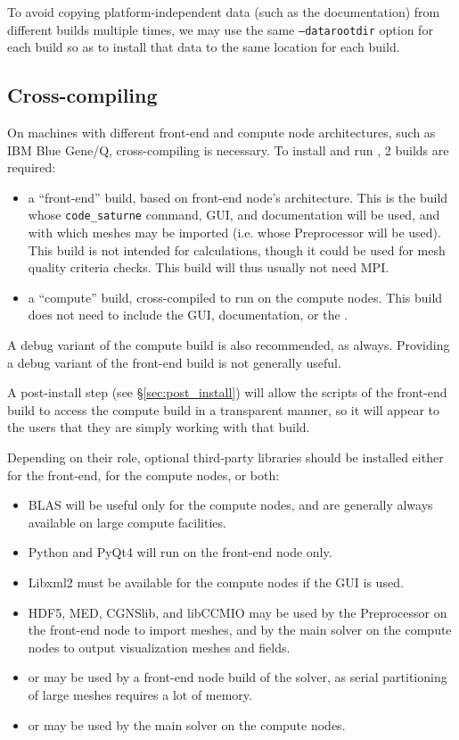 \documentclass[a4paper,10pt,twoside]{csshortdoc}
\begin{document}
To avoid copying platform-independent data (such as the documentation)
from different builds multiple times, we may use the same
\texttt{--datarootdir} option for each build so as to install that
data to the same location for each build.

\subsection{Cross-compiling}

On machines with different front-end and compute node architectures,
such as IBM Blue Gene/Q, cross-compiling is necessary.
To install and run \CS, 2 builds are required:

\begin{itemize}
\item a ``front-end'' build, based on front-end node's architecture. This is
      the build whose \texttt{code\_saturne} command, GUI, and documentation
      will be used, and with which meshes may be imported (i.e. whose
      Preprocessor will be used). This build is not intended for calculations,
      though it could be used for mesh quality criteria checks.
      This build will thus usually not need  MPI.
\item a ``compute'' build, cross-compiled to run on the compute nodes.
      This build does not need to include the GUI, documentation, or
      the \pcs.
\end{itemize}

A debug variant of the compute build is also recommended, as always.
Providing a debug variant of the front-end build is not generally useful.

A post-install step (see \S\ref{sec:post_install}) will allow
the scripts of the front-end build to access the compute build in a transparent
manner, so it will appear to the users that they are simply working with that
build.

Depending on their role, optional third-party libraries should be installed
either for the front-end, for the compute nodes, or both:

\begin{itemize}
\item BLAS will be useful only for the compute nodes, and are generally
      always available on large compute facilities.
\item Python and PyQt4 will run on the front-end node only.
\item Libxml2 must be available for the compute nodes if the GUI is used.
\item HDF5, MED, CGNSlib, and libCCMIO may be used by the Preprocessor on
      the front-end node to import meshes, and by the main solver on the
      compute nodes to output visualization meshes and fields.
\item \scotch or \metis may be used by a front-end node build of the
      solver, as serial partitioning of large meshes requires a lot of memory.
\item \ptscotch or \parmetis may be used by the main solver on the
      compute nodes.
\end{itemize}
\end{document}

